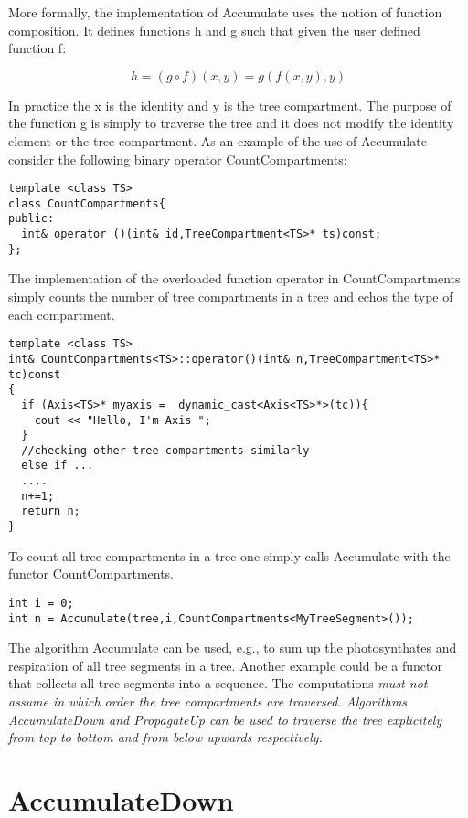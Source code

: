 More formally, the implementation of Accumulate uses the notion of
function composition. It defines functions h and g such that given the
user defined function f:

\begin{displaymath}
h = (g \circ f)(x,y) =  g(f(x,y),y)
\end{displaymath}

In practice the x is the  identity and y  is the tree compartment. The
purpose of the function g  is simply to  traverse the tree and it does
not modify the identity element or the tree compartment. As an example
of   the use  of  Accumulate  consider  the  following binary operator
CountCompartments:

\begin{verbatim}
template <class TS>
class CountCompartments{
public:
  int& operator ()(int& id,TreeCompartment<TS>* ts)const;
};
\end{verbatim}

The  implementation   of   the  overloaded   function     operator  in
CountCompartments simply  counts the number of  tree compartments in a
tree and echos the type of each compartment.

\begin{verbatim}
template <class TS>
int& CountCompartments<TS>::operator()(int& n,TreeCompartment<TS>* tc)const
{
  if (Axis<TS>* myaxis =  dynamic_cast<Axis<TS>*>(tc)){
    cout << "Hello, I'm Axis ";
  }
  //checking other tree compartments similarly
  else if ...  
  ....
  n+=1;
  return n;
}
\end{verbatim}

To count all tree compartments in a tree one simply calls Accumulate
with the functor CountCompartments.

\begin{verbatim}
int i = 0;
int n = Accumulate(tree,i,CountCompartments<MyTreeSegment>());
\end{verbatim}

The  algorithm   Accumulate  can  be   used,  e.g.,  to  sum   up  the
photosynthates and respiration of all tree segments in a tree. Another
example  could be a  functor that  collects all  tree segments  into a
sequence.  The computations \it must not assume \rm in which order the
tree  compartments  are   traversed.   Algorithms  AccumulateDown  and
PropagateUp can be  used to traverse the tree  explicitely from top to
bottom and from below upwards respectively.

\section{AccumulateDown}

